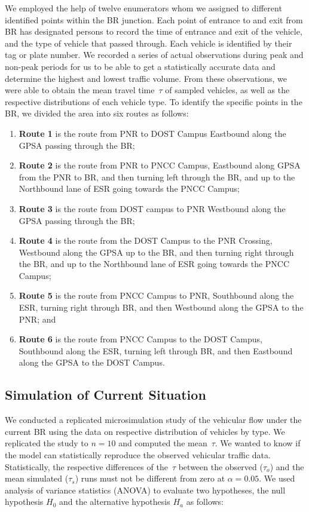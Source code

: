 \documentclass[preprint]{./acm_proc_article-sp}
\begin{document}
We employed the help of twelve enumerators whom we assigned to different identified points within the BR junction.  Each point of entrance to and exit from BR has designated persons to record the time of entrance and exit of the vehicle, and the type of vehicle that passed through. Each vehicle is identified by their tag or plate number. We recorded a series of actual observations during peak and non-peak periods for us to be able to get a statistically accurate data and determine the highest and lowest traffic volume.  From these observations, we were able to obtain the mean travel time~$\tau$ of sampled vehicles, as well as the respective distributions of each vehicle type. To identify the specific points in the BR, we divided the area into six routes as follows:
\begin{enumerate}
\item {\bf Route 1} is the route from PNR to DOST Campus Eastbound along the GPSA passing through the BR;
\item {\bf Route 2} is the route from PNR to PNCC Campus, Eastbound along GPSA from the PNR to BR, and then turning left through the BR, and up to the Northbound lane of ESR going towards the PNCC Campus;
\item {\bf Route 3} is the route from DOST campus to PNR Westbound along the GPSA passing through the BR;
\item {\bf Route 4} is the route from the DOST Campus to the PNR Crossing, Westbound along the GPSA up to the BR, and then turning right through the BR, and up to the Northbound lane of ESR going towards the PNCC Campus;
\item {\bf Route 5} is the route from PNCC Campus to PNR, Southbound along the ESR, turning right through BR, and then Westbound along the GPSA to the PNR; and
\item {\bf Route 6} is the route from PNCC Campus to the DOST Campus, Southbound along the ESR, turning left through BR, and then Eastbound along the GPSA to the DOST Campus.
\end{enumerate}

\subsection{Simulation of Current Situation}

We conducted a replicated microsimulation study of the vehicular flow under the current BR using the data on respective distribution of vehicles by type. We replicated the study to $n=10$ and computed the mean~$\tau$. We wanted to know if the model can statistically reproduce the observed vehicular traffic data. Statistically, the respective differences of the~$\tau$ between the observed ($\tau_o$) and the mean simulated ($\tau_s$) runs must not be different from zero at $\alpha=0.05$. We used analysis of variance statistics (ANOVA) to evaluate two hypotheses, the null hypothesis $H_0$ and the alternative hypothesis $H_a$ as follows:
\end{document}
